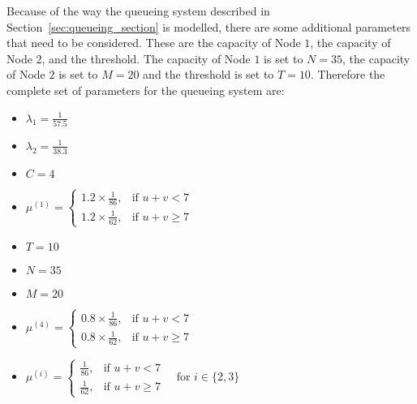 Because of the way the queueing system described in
Section~\ref{sec:queueing_section} is modelled, there are some additional
parameters that need to be considered.
These are the capacity of Node \(1\), the capacity of Node \(2\), and the
threshold.
The capacity of Node \(1\) is set to \(N = 35\), the capacity of Node \(2\) is
set to \(M = 20\) and the threshold is set to \(T = 10\).
Therefore the complete set of parameters for the queueing system are:

\begin{multicols}{2}
    \begin{itemize}
        \item \(\lambda_1 = \frac{1}{57.5}\)
        \item \(\lambda_2 = \frac{1}{38.3}\)
        \item \(C = 4\)
        \item \(\mu^{(1)} =
        \begin{cases}
            1.2 \times \frac{1}{86}, & \text{if } u + v < 7 \\
            1.2 \times \frac{1}{62}, & \text{if } u + v \geq 7    
        \end{cases}\)
        \item \(T = 10\)
        \item \(N = 35\)
        \item \(M = 20\)
        \item \(\mu^{(4)} =
        \begin{cases}
            0.8 \times \frac{1}{86}, & \text{if } u + v < 7 \\
            0.8 \times \frac{1}{62}, & \text{if } u + v \geq 7    
        \end{cases}\)
    \end{itemize}
\end{multicols}

\begin{center}
    \begin{minipage}{0.6\textwidth}
        \begin{itemize}
            \item \(\mu^{(i)} =
            \begin{cases}
                \frac{1}{86}, & \text{if } u + v < 7 \\
                \frac{1}{62}, & \text{if } u + v \geq 7    
            \end{cases} \quad \text{for } i \in \{2,3\}\)    
        \end{itemize}    
    \end{minipage}
\end{center}

